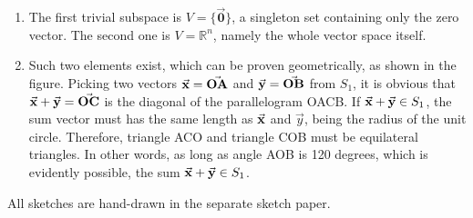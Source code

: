 \documentclass{article}
\begin{document}
\begin{enumerate}
\item The first trivial subspace is $V = \{\vec{\mathbf{0}}\}$, a singleton set containing only the zero vector. The second one is $V = \mathbb{R}^n$, namely the whole vector space itself.

\item Such two elements exist, which can be proven geometrically, as shown in the figure. Picking two vectors $\vec{\mathbf{x}} = \vec{\mathbf{OA}}$ and $\vec{\mathbf{y}} = \vec{\mathbf{OB}}$ from $S_1$, it is obvious that $\vec{\mathbf{x}} + \vec{\mathbf{y}} = \vec{\mathbf{OC}}$ is the diagonal of the parallelogram OACB. If $\vec{\mathbf{x}} + \vec{\mathbf{y}} \in S_1$, the sum vector must has the same length as $\vec{\mathbf{x}}$ and $\vec{y}$, being the radius of the unit circle. Therefore, triangle ACO and triangle COB must be equilateral triangles. In other words, as long as angle AOB is 120 degrees, which is evidently possible, the sum $\vec{\mathbf{x}} + \vec{\mathbf{y}} \in S_1$. \QED

\begin{figure}[h]
\begin{center}
\end{center}
\end{figure}
\end{enumerate}

All sketches are hand-drawn in the separate sketch paper.



\end{document}
